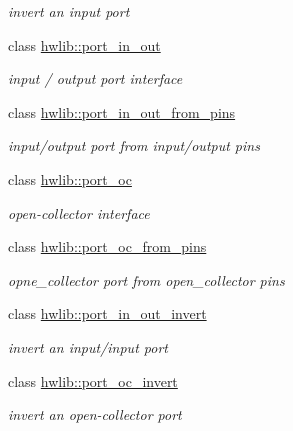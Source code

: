 \begin{DoxyCompactItemize}
\begin{DoxyCompactList}\small\item\em invert an input port \end{DoxyCompactList}\item 
class \hyperlink{classhwlib_1_1port__in__out}{hwlib\+::port\+\_\+in\+\_\+out}
\begin{DoxyCompactList}\small\item\em input / output port interface \end{DoxyCompactList}\item 
class \hyperlink{classhwlib_1_1port__in__out__from__pins}{hwlib\+::port\+\_\+in\+\_\+out\+\_\+from\+\_\+pins}
\begin{DoxyCompactList}\small\item\em input/output port from input/output pins \end{DoxyCompactList}\item 
class \hyperlink{classhwlib_1_1port__oc}{hwlib\+::port\+\_\+oc}
\begin{DoxyCompactList}\small\item\em open-\/collector interface \end{DoxyCompactList}\item 
class \hyperlink{classhwlib_1_1port__oc__from__pins}{hwlib\+::port\+\_\+oc\+\_\+from\+\_\+pins}
\begin{DoxyCompactList}\small\item\em opne\+\_\+collector port from open\+\_\+collector pins \end{DoxyCompactList}\item 
class \hyperlink{classhwlib_1_1port__in__out__invert}{hwlib\+::port\+\_\+in\+\_\+out\+\_\+invert}
\begin{DoxyCompactList}\small\item\em invert an input/input port \end{DoxyCompactList}\item 
class \hyperlink{classhwlib_1_1port__oc__invert}{hwlib\+::port\+\_\+oc\+\_\+invert}
\begin{DoxyCompactList}\small\item\em invert an open-\/collector port \end{DoxyCompactList}\end{DoxyCompactItemize}
